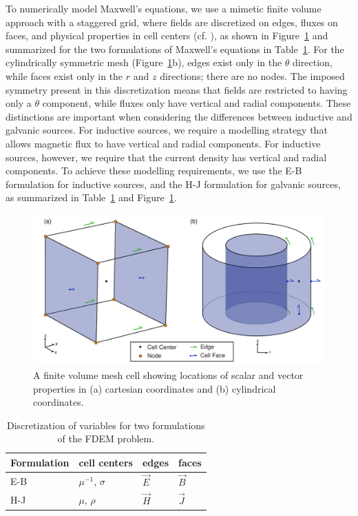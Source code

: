 \documentclass{segabs}
\begin{document}
To numerically model Maxwell's equations, we use a mimetic finite volume approach with a staggered grid, where fields are discretized on edges, fluxes on faces, and physical properties in cell centers (cf. \cite{Haber2014a}), as shown in Figure~\ref{fig:fvcells} and summarized for the two formulations of Maxwell's equations in Table~\ref{tab:DiscEBHJ}. For the cylindrically symmetric mesh (Figure~\ref{fig:fvcells}b), edges exist only in the $\theta$ direction, while faces exist only in the $r$ and $z$ directions; there are no nodes. The imposed symmetry present in this discretization means that fields are restricted to having only a $\theta$ component, while fluxes only have vertical and radial components. These distinctions are important when considering the differences between inductive and galvanic sources. For inductive sources, we require a modelling strategy that allows magnetic flux to have vertical and radial components. For inductive sources, however, we require that the current density has vertical and radial components. To achieve these modelling requirements, we use the E-B formulation for inductive sources, and the H-J formulation for galvanic sources, as summarized in Table~\ref{tab:DiscEBHJ} and Figure~\ref{fig:fvcells}.
\begin{figure}[h!]
	\centering
	\includegraphics[width=0.9\columnwidth]{./Figures/FVcubes}
	\caption{A finite volume mesh cell showing locations of scalar and vector properties in (a) cartesian coordinates and (b) cylindrical coordinates.}
	\label{fig:fvcells}
\end{figure}
\begin{table}[h!]
\centering
\begin{tabular}{| l | l | l | l |}
	\hline
	\textbf{Formulation} & \textbf{cell centers} & \textbf{edges} & \textbf{faces} \\
	\hline
	E-B                  & $\mu^{-1}$, $\sigma$  & $\vec{E}$      & $\vec{B}$      \\
	H-J                  & $\mu$, $\rho$              & $\vec{H}$      & $\vec{J}$       \\
	\hline
	\end{tabular}
	\label{tab:DiscEBHJ}
	\caption{Discretization of variables for two formulations of the FDEM problem.}
\end{table}
\end{document}
